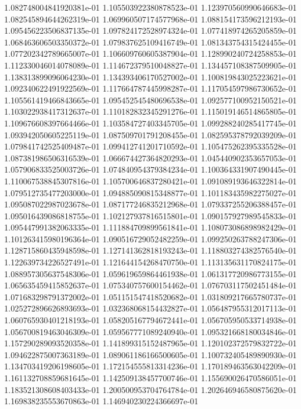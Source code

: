1.082748004841920381e-01
1.105503922380878523e-01
1.123970560990646683e-01
1.082545894644262319e-01
1.069960507174577968e-01
1.088154173596212193e-01
1.095456223506837135e-01
1.097824172528974324e-01
1.077418974265205859e-01
1.068463606503350372e-01
1.079837625109416749e-01
1.081343754315424455e-01
1.077202342789665007e-01
1.106609760605387904e-01
1.128990240724258853e-01
1.112330046014078089e-01
1.114672379510048827e-01
1.134457108387509905e-01
1.138313899096064230e-01
1.134393406170527002e-01
1.100819843025223621e-01
1.092340622491922569e-01
1.117664787445998287e-01
1.117054597986730652e-01
1.105561419466843665e-01
1.095452545480696538e-01
1.092577100952150521e-01
1.103022938417312637e-01
1.110182832345291276e-01
1.115019146514865805e-01
1.109676608397664466e-01
1.103584727403345705e-01
1.099288240285417745e-01
1.093942050605225119e-01
1.087509701791208455e-01
1.082595378792039209e-01
1.079841742525409487e-01
1.099412741201710592e-01
1.105475262395335528e-01
1.087381986506316539e-01
1.066674427364820293e-01
1.045440902353657053e-01
1.057906833525003726e-01
1.074840954379384234e-01
1.100364331907490445e-01
1.110067538845307816e-01
1.105700646837280421e-01
1.091089193646322814e-01
1.079512735477203000e-01
1.094885090815348877e-01
1.101183435982275027e-01
1.095087022987023678e-01
1.087177246835212968e-01
1.079337255206388457e-01
1.095016439086818755e-01
1.102127937816515801e-01
1.090157927989545833e-01
1.095447991382063335e-01
1.111884709899561841e-01
1.108073086898982429e-01
1.101263415980196364e-01
1.090516729052482259e-01
1.099250263788247306e-01
1.128715860435948598e-01
1.127141362818193243e-01
1.118803274382576540e-01
1.122639734226527491e-01
1.121644154268470750e-01
1.113135631170824175e-01
1.088957305637548306e-01
1.059619659864461938e-01
1.061317720986773155e-01
1.065635459415852637e-01
1.075340757600154462e-01
1.076703117502451484e-01
1.071683298791372002e-01
1.051151547418520682e-01
1.031809217665780737e-01
1.025272896626893693e-01
1.032368068154432827e-01
1.056487955312017113e-01
1.060765930401218193e-01
1.058205167794672441e-01
1.056705950533714938e-01
1.056700819463046309e-01
1.059567771089240940e-01
1.095321668180034846e-01
1.157290289093520358e-01
1.141899315152487965e-01
1.120102372579832722e-01
1.094622875007363189e-01
1.089061186166500605e-01
1.100732405489890930e-01
1.134703419206198605e-01
1.172154555813314236e-01
1.170189463563042209e-01
1.161132708859681645e-01
1.142509138457700746e-01
1.155690026470586051e-01
1.183521308608403433e-01
1.200500953704764784e-01
1.202646946580875620e-01
1.169838235553670863e-01
1.146940230224366697e-01
